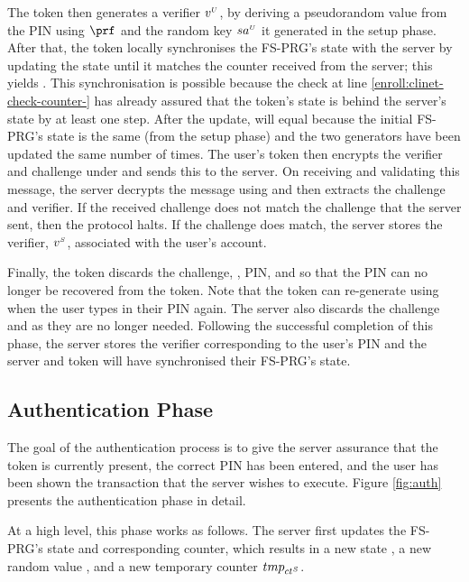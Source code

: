 The token then generates a verifier ${v}^{\scriptscriptstyle U}$, by deriving a pseudorandom value from the PIN using $\prf$ and the random key ${sa}^{\scriptscriptstyle U}$ it generated in the setup phase.  After that, the token locally synchronises the FS-PRG's state with the server by updating the state until it matches the counter received from the server; this yields . This synchronisation is possible because the check at line \ref{enroll:clinet-check-counter-} has already assured that the token's state is behind the server's state by at least one step. After the update,  will equal  because the initial FS-PRG's state is the same (from the setup phase) and the two generators have been updated the same number of times. The user's token then encrypts the verifier and challenge under  and sends this to the server. 
On receiving and validating this message, the server decrypts the message using  and then extracts the challenge and verifier.
If the received challenge does not match the challenge that the server sent, then the protocol halts.
If the challenge does match, the server stores the verifier, ${v}^{\scriptscriptstyle S}$,  associated with the user's account.

Finally, the token discards the challenge, , PIN, and \VC{\verifier} so that the PIN can no longer be recovered from the token. Note that the token can re-generate \VC{\verifier} using \VC{\salt} when the user types in their PIN again. The server also discards the challenge and  as they are no longer needed. Following the successful completion of this phase, the server stores the verifier corresponding to the user's PIN and the server and token will have synchronised their FS-PRG's state.

\subsection{Authentication Phase}
\label{sec:authentication}

The goal of the authentication process is to give the server assurance that the token is currently present, the correct PIN has been entered, and the user has been shown the transaction that the server wishes to execute. Figure \ref{fig:auth} presents the authentication phase in detail. 



At a high level, this phase works as follows. The server first updates the FS-PRG's state and corresponding counter, which results in a new state \VS{\state}, a new random value  , and a new temporary counter ${tmp}_{{ct}^{\scriptscriptstyle S}}$. 

